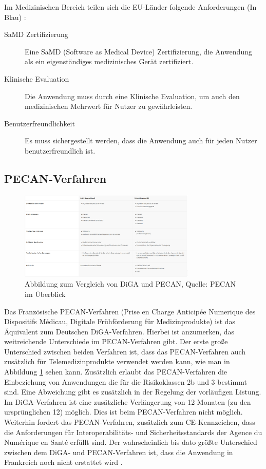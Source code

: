 \documentclass{article}
\begin{document}
		Im Medizinischen Bereich teilen sich die EU-Länder folgende Anforderungen (In Blau) \cite{dtx-regulatory-frameworks}:
		\begin{description}
			\item[SaMD Zertifizierung] Eine SaMD (Software as Medical Device) Zertifizierung, die Anwendung als ein eigenständiges medizinisches Gerät zertifiziert.
			\item[Klinische Evaluation] Die Anwendung muss durch eine Klinische Evaluation, um auch den medizinischen Mehrwert für Nutzer zu gewährleisten.
			\item[Benutzerfreundlichkeit] Es muss sichergestellt werden, dass die Anwendung auch für jeden Nutzer benutzerfreundlich ist.
		\end{description}
		\newpage  
		\subsection{PECAN-Verfahren}
			\begin{figure}[htbp]
				\centering
				\includegraphics[width=0.75\textwidth]{./grafiken/abbildung-diga-versus-pecan}
				\caption[DiGA vs. PECAN]{Abbildung zum Vergleich von DiGA und PECAN, Quelle: PECAN im Überblick \cite{PECAN-Verfahren}}
				\label{Abb-diga-vs-pecan}
			\end{figure}
			Das Französische PECAN-Verfahren (Prise en Charge Anticipée Numerique des Dispositifs Médicau, Digitale Frühförderung für Medizinprodukte) ist das Äquivalent zum Deutschen DiGA-Verfahren. Hierbei ist anzumerken, das weitreichende Unterschiede im PECAN-Verfahren gibt. Der erste große Unterschied zwischen beiden Verfahren ist, dass das PECAN-Verfahren auch zusätzlich für Telemedizinprodukte verwendet werden kann, wie man in Abbildung \ref{Abb-diga-vs-pecan} sehen kann. Zusätzlich erlaubt das PECAN-Verfahren die Einbeziehung von Anwendungen die für die Risikoklassen 2b und 3 bestimmt sind. Eine Abweichung gibt es zusätzlich in der Regelung der vorläufigen Listung. Im DiGA-Verfahren ist eine zusätzliche Verlängerung von 12 Monaten (zu den ursprünglichen 12) möglich. Dies ist beim PECAN-Verfahren nicht möglich. Weiterhin fordert das PECAN-Verfahren, zusätzlich zum CE-Kennzeichen, dass die Anforderungen für Interoperabilitäts- und Sicherheitsstandards der Agence du Numérique en Santé erfüllt sind. Der wahrscheinlich bis dato größte Unterschied zwischen dem DiGA- und PECAN-Verfahren ist, dass die Anwendung in Frankreich noch nicht erstattet wird \cite{PECAN-Verfahren}.
\end{document}
